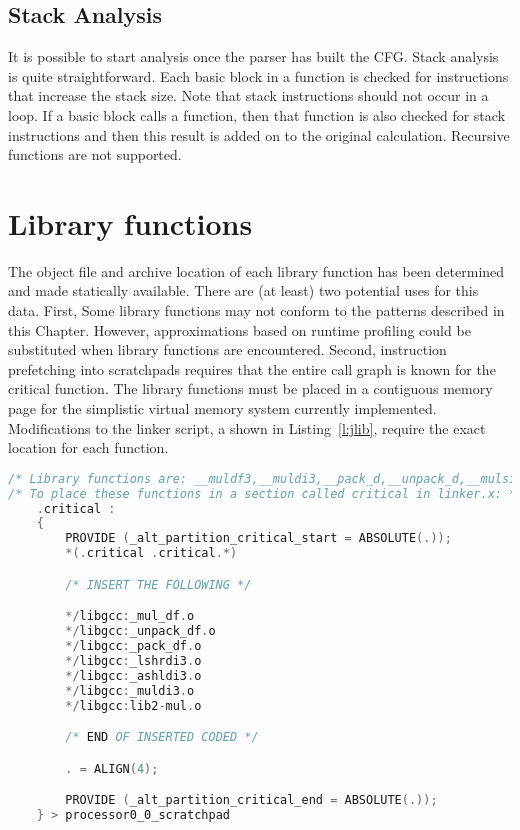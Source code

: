 \subsection{Stack Analysis}
It is possible to start analysis once the parser has built the CFG. Stack analysis is quite straightforward. Each basic block in a function is checked for instructions that increase the stack size. Note that stack instructions should not occur in a loop. If a basic block calls a function, then that function is also checked for stack instructions and then this result is added on to the original calculation. Recursive functions are not supported.


\section{Library functions}

The object file and archive location of each library function has been determined and made statically available. There are (at least) two potential uses for this data. First, Some library functions may not conform to the patterns described in this Chapter. However, approximations based on runtime profiling could be substituted when library functions are encountered. Second, instruction prefetching into scratchpads requires that the entire call graph is known for the critical function. The library functions must be placed in a contiguous memory page for the simplistic virtual memory system currently implemented. Modifications to the linker script, a shown in Listing~\ref{l:jlib}, require the exact location for each function.

% 
\begin{lstlisting}[caption={Placing library functions in \texttt{.critical} region},label=l:jlib,language=C]
/* Library functions are: __muldf3,__muldi3,__pack_d,__unpack_d,__mulsi3,__lshrdi3,__ashldi3 */
/* To place these functions in a section called critical in linker.x: */
    .critical :
    {
        PROVIDE (_alt_partition_critical_start = ABSOLUTE(.));
        *(.critical .critical.*)

        /* INSERT THE FOLLOWING */

        */libgcc:_mul_df.o
        */libgcc:_unpack_df.o
        */libgcc:_pack_df.o
        */libgcc:_lshrdi3.o
        */libgcc:_ashldi3.o
        */libgcc:_muldi3.o
        */libgcc:lib2-mul.o

        /* END OF INSERTED CODED */

        . = ALIGN(4);

        PROVIDE (_alt_partition_critical_end = ABSOLUTE(.));
    } > processor0_0_scratchpad


\end{lstlisting}


